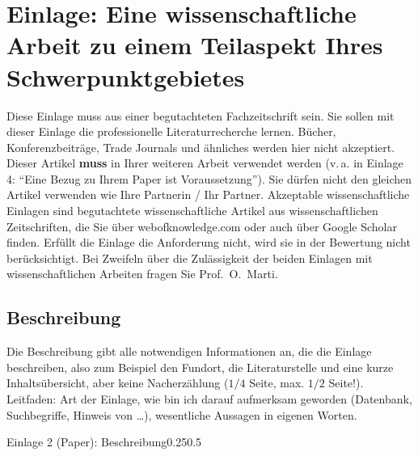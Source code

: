 
\section{Einlage: Eine wissenschaftliche Arbeit zu einem Teilaspekt Ihres Schwerpunktgebietes}
\label{sec:paper}

\begin{hinweise}
Diese Einlage muss aus einer begutachteten Fachzeitschrift sein. Sie sollen mit dieser Einlage die
professionelle Literaturrecherche lernen. Bücher, Konferenzbeiträge, Trade Journals und ähnliches werden hier
nicht akzeptiert.
Dieser Artikel \textbf{muss} in Ihrer weiteren Arbeit verwendet werden (v.\,a. in Einlage 4: \enquote{Eine
Bezug zu Ihrem Paper ist Voraussetzung}).
Sie dürfen nicht den gleichen Artikel verwenden wie Ihre Partnerin / Ihr Partner.
Akzeptable wissenschaftliche Einlagen sind begutachtete wissenschaftliche Artikel aus wissenschaftlichen
Zeitschriften, die Sie über webofknowledge.com oder auch über Google Scholar finden. Erfüllt die Einlage die
Anforderung nicht, wird sie in der Bewertung nicht berücksichtigt. Bei Zweifeln über die Zulässigkeit der
beiden Einlagen mit wissenschaftlichen Arbeiten fragen Sie Prof.~O.~Marti.
\end{hinweise}

\subsection{Beschreibung}
\begin{hinweise}
Die Beschreibung gibt alle notwendigen Informationen an, die die Einlage beschreiben, also zum Beispiel den
Fundort, die Literaturstelle und eine kurze Inhaltsübersicht, aber keine Nacherzählung ($1/4$ Seite, max.
$1/2$ Seite!). Leitfaden: Art der Einlage, wie bin ich darauf aufmerksam geworden (Datenbank, Suchbegriffe,
Hinweis von \dots), wesentliche Aussagen in eigenen Worten.
\end{hinweise}
\begin{umfang}{Einlage 2 (Paper): Beschreibung}{0.25}{0.5}
\end{umfang}

